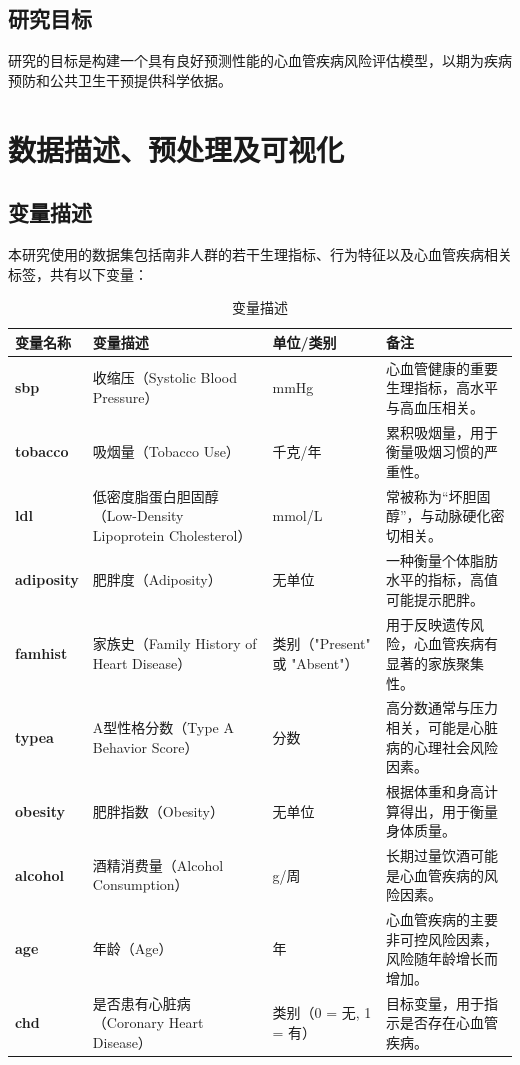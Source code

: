 \documentclass[UTF8]{article}
\begin{document}
	\subsection{研究目标}
	研究的目标是构建一个具有良好预测性能的心血管疾病风险评估模型，以期为疾病预防和公共卫生干预提供科学依据。\\
	
	\newpage
	\section{数据描述、预处理及可视化}
	\subsection{变量描述}
	本研究使用的数据集包括南非人群的若干生理指标、行为特征以及心血管疾病相关标签，共有以下变量：
\begin{table}[ht]
	\centering
	\caption{变量描述}
	\begin{tabularx}{\textwidth}{|l|X|l|X|}
		\hline
		\textbf{变量名称} & \textbf{变量描述} & \textbf{单位/类别} & \textbf{备注} \\ \hline
		\textbf{sbp}      & 收缩压（Systolic Blood Pressure）       & mmHg         & 心血管健康的重要生理指标，高水平与高血压相关。 \\ \hline
		\textbf{tobacco}  & 吸烟量（Tobacco Use）                  & 千克/年      & 累积吸烟量，用于衡量吸烟习惯的严重性。          \\ \hline
		\textbf{ldl}      & 低密度脂蛋白胆固醇（Low-Density Lipoprotein Cholesterol） & mmol/L      & 常被称为“坏胆固醇”，与动脉硬化密切相关。       \\ \hline
		\textbf{adiposity}& 肥胖度（Adiposity）                    & 无单位       & 一种衡量个体脂肪水平的指标，高值可能提示肥胖。  \\ \hline
		\textbf{famhist}  & 家族史（Family History of Heart Disease） & 类别（"Present" 或 "Absent"） & 用于反映遗传风险，心血管疾病有显著的家族聚集性。 \\ \hline
		\textbf{typea}    & A型性格分数（Type A Behavior Score）    & 分数         & 高分数通常与压力相关，可能是心脏病的心理社会风险因素。 \\ \hline
		\textbf{obesity}  & 肥胖指数（Obesity）                    & 无单位       & 根据体重和身高计算得出，用于衡量身体质量。      \\ \hline
		\textbf{alcohol}  & 酒精消费量（Alcohol Consumption）       & g/周         & 长期过量饮酒可能是心血管疾病的风险因素。        \\ \hline
		\textbf{age}      & 年龄（Age）                            & 年           & 心血管疾病的主要非可控风险因素，风险随年龄增长而增加。 \\ \hline
		\textbf{chd}      & 是否患有心脏病（Coronary Heart Disease） & 类别（0 = 无, 1 = 有） & 目标变量，用于指示是否存在心血管疾病。         \\ \hline
	\end{tabularx}
	\label{table:variables}
\end{table}
	\newpage
\end{document}
